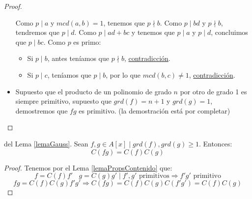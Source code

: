 \begin{lema}[de Gauss]
\begin{proof}
\begin{itemize}
            Como $p \mid a$ y $mcd(a,b) = 1$, tenemos que $p \nmid b$. Como $p \mid bd$ y $p \nmid b$, tendremos que $p\mid d$. Como $p \mid ad + bc$ y tenemos que $p\mid a$ y $p \mid d$, concluimos que $p \mid bc$. Como $p$ es primo:
            \begin{itemize}
                \item Si $p \mid b$, antes teníamos que $p\nmid b$, \underline{contradicción}.
                \item Si $p\mid c$, teníamos que $p\mid b$, por lo que $mcd(b,c) \neq 1$, \underline{contradicción}.
            \end{itemize}
        \item Supuesto que el producto de un polinomio de grado $n$ por otro de grado 1 es siempre primitivo, supuesto que $grd(f) = n+1$ y $grd(g) = 1$, demostremos que $fg$ es primitivo. %
            (la demostración está por completar) %
    \end{itemize}
\end{proof}
\end{lema}

\begin{coro}
    del Lema \ref{lemaGauss}.\newline
    Sean $f,g \in A[x] \mid grd(f),grd(g) \geq 1$. Entonces:
    $$C(fg)=C(f)C(g)$$
\begin{proof}
    Tenemos por el Lema \ref{lemaPropsContenido} que:
    $$f = C(f)f'~~~~g=C(g)g' \mid f',g' \mbox{ primitivos} \Rightarrow f'g' \mbox{ primitivo}$$
    $$fg = C(f)C(g)f'g' \Rightarrow C(fg) = C(f)C(g)C(f'g') = C(f)C(g)$$
\end{proof}
\end{coro}

